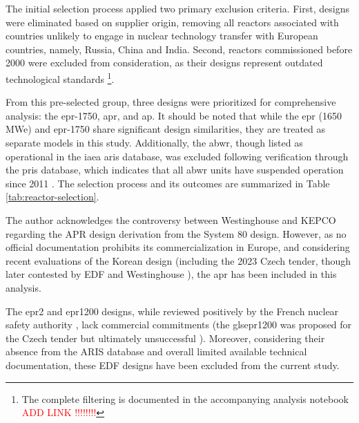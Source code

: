 The initial selection process applied two primary exclusion criteria. First, designs were eliminated based on supplier origin, removing all reactors associated with countries unlikely to engage in nuclear technology transfer with European countries, namely, Russia, China and India. Second, reactors commissioned before 2000 were excluded from consideration, as their designs represent outdated technological standards \footnote{The complete filtering is documented in the accompanying analysis notebook \textcolor{red}{ADD LINK !!!!!!!!}}.

From this pre-selected group, three designs were prioritized for comprehensive analysis: the \gls{epr}-1750, \gls{apr}, and \gls{ap}. It should be noted that while the \gls{epr} (1650 MWe) and \gls{epr}-1750 share significant design similarities, they are treated as separate models in this study. Additionally, the \gls{abwr}, though listed as operational in the \gls{iaea} \gls{aris} database, was excluded following verification through the \gls{pris} database, which indicates that all \gls{abwr} units have suspended operation since 2011 \cite{IAEA_PRIS_2025}. The selection process and its outcomes are summarized in Table \ref{tab:reactor-selection}.

The author acknowledges the controversy between Westinghouse and KEPCO regarding the APR design derivation from the System 80 design. However, as no official documentation prohibits its commercialization in Europe, and considering recent evaluations of the Korean design (including the 2023 Czech tender, though later contested by EDF and Westinghouse \cite{WNN_Czech_Nuclear_Appeal_2024}), the \gls{apr} has been included in this analysis.

The \gls{epr}2 and \gls{epr}1200 designs, while reviewed positively by the French nuclear safety authority \cite{WNN_EPR1200_Safety_2023}, lack commercial commitments (the gls{epr}1200 was proposed for the Czech tender but ultimately unsuccessful \cite{WNN_Czech_Nuclear_Appeal_2024}). Moreover, considering their absence from the ARIS database and overall limited available technical documentation, these EDF designs have been excluded from the current study.



